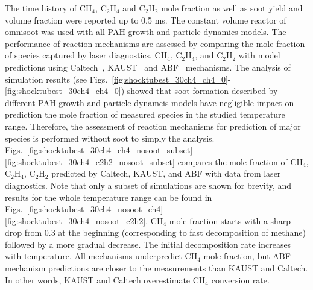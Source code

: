  The time history of $\mathrm{CH_4}$, $\mathrm{C_2H_4}$ and $\mathrm{C_2H_2}$ mole fraction as well as soot yield and volume fraction were reported up to 0.5 ms. The constant volume reactor of omnisoot was used with all PAH growth and particle dynamics models. The performance of reaction mechanisms are assessed by comparing the mole fraction of species captured by laser diagnostics, $\mathrm{CH_4}$, $\mathrm{C_2H_4}$, and $\mathrm{C_2H_2}$ with model predictions using Caltech~\citep{blanquart2009chemical}, KAUST~\cite{wang2013pah} and ABF~\citep{appel2000kinetic} mechanisms. The analysis of simulation results (see Figs.~\ref{fig:shocktubest_30ch4_ch4_0}-\ref{fig:shocktubest_30ch4_ch4_0}) showed that soot formation described by different PAH growth and particle dynamcis models have negligible impact on prediction the mole fraction of measured species in the studied temperature range. Therefore, the assessment of reaction mechanisms for prediction of major species is performed without soot to simply the analysis. Figs.~\ref{fig:shocktubest_30ch4_ch4_nosoot_subset}-\ref{fig:shocktubest_30ch4_c2h2_nosoot_subset} compares the mole fraction of $\mathrm{CH_4}$, $\mathrm{C_2H_4}$, $\mathrm{C_2H_2}$ predicted by Caltech, KAUST, and ABF with data from laser diagnostics. Note that only a subset of simulations are shown for brevity, and results for the whole temperature range can be found in Figs.~\ref{fig:shocktubest_30ch4_nosoot_ch4}-\ref{fig:shocktubest_30ch4_nosoot_c2h2}. $\mathrm{CH_4}$ mole fraction starts with a sharp drop from 0.3 at the beginning (corresponding to fast decomposition of methane) followed by a more gradual decrease. The initial decomposition rate increases with temperature. All mechanisms underpredict $\mathrm{CH_4}$ mole fraction, but ABF mechanism predictions are closer to the measurements than KAUST and Caltech. In other words, KAUST and Caltech overestimate $\mathrm{CH_4}$ conversion rate.
